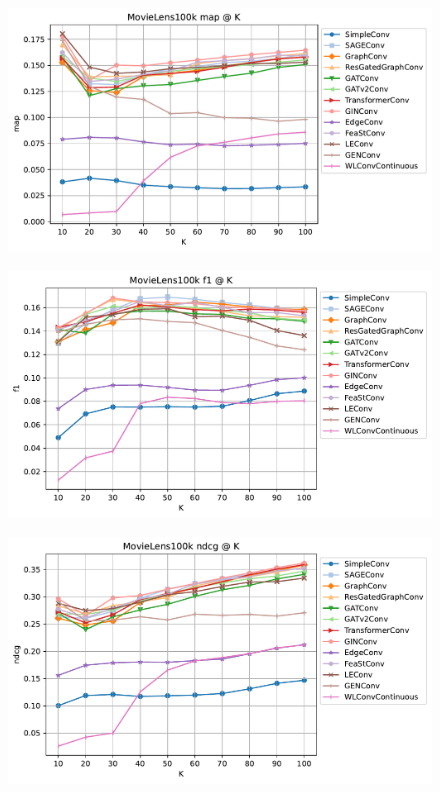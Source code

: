 \documentclass{scrartcl}
\begin{document}
\begin{figure}
\begin{center}
\begin{minipage}[b]{0.48\textwidth}
    \centering
    \includegraphics[width=\textwidth]{imgs/MovieLens100k_map.pdf}
    \label{fig:map}
\end{minipage}
\hfill
\begin{minipage}[b]{0.48\textwidth}
    \centering
    \includegraphics[width=\textwidth]{imgs/MovieLens100k_f1.pdf}
    \label{fig:f1}
\end{minipage}

\begin{minipage}[b]{0.48\textwidth}
    \centering
    \includegraphics[width=\textwidth]{imgs/MovieLens100k_ndcg.pdf}
    \label{fig:ndcg}
\end{minipage}
\end{center}
\end{figure}
\end{document}
